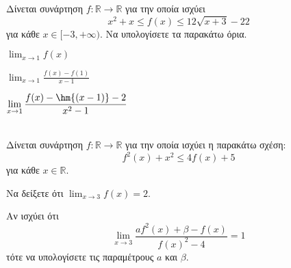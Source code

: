 \documentclass[twoside,nofonts,ektypwsh]{frontisthrio-diag}
\begin{document}
\begin{thema}
Δίνεται συνάρτηση $ f:\mathbb{R}\to\mathbb{R} $ για την οποία ισχύει
\[ x^2+x\leq f(x)\leq 12\sqrt{x+3}-22 \]
για κάθε $ x\in[-3,+\infty) $. Να υπολογίσετε τα παρακάτω όρια.
\begin{multicols}{3}
\begin{erwthma}
\item $ {\displaystyle{\lim_{x\to 1}{f(x)}}} $
\item $ {\displaystyle{\lim_{x\to 1}{\frac{f(x)-f(1)}{x-1}}}} $
\item $ {\displaystyle{\lim_{x\to 1}{\frac{f(x)-\hm{(x-1)}-2}{x^2-1}}}} $
\end{erwthma}
\end{multicols}
\item \mbox{}\\
Δίνεται συνάρτηση $ f:\mathbb{R}\to\mathbb{R} $ για την οποία ισχύει η παρακάτω σχέση:
\[ f^2(x)+x^2\leq 4f(x)+5 \]
για κάθε $ x\in\mathbb{R} $.
\begin{erwthma}
\item Να δείξετε ότι $ {\displaystyle{\lim_{x\to 3}{f(x)}}}=2 $.
\item Αν ισχύει ότι 
\[ \lim_{x\to 3}{\frac{af^2(x)+\beta-f(x)}{f(x)^2-4}}=1 \]
τότε να υπολογίσετε τις παραμέτρους $ a $ και $ \beta $.
\end{erwthma}
\end{thema}
\kaliepityxia
\end{document}
